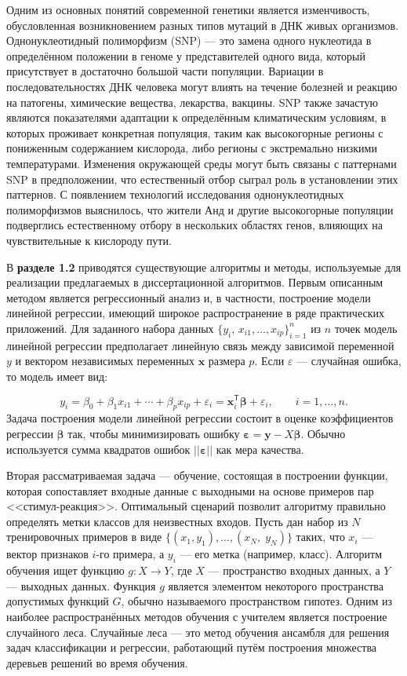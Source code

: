 Одним из основных понятий современной генетики является изменчивость, обусловленная возникновением разных типов мутаций в ДНК живых организмов. Однонуклеотидный полиморфизм (SNP) --- это замена одного нуклеотида в определённом положении в геноме у представителей одного вида, который присутствует в достаточно большой части популяции. Вариации в последовательностях ДНК человека могут влиять на течение болезней и реакцию на патогены, химические вещества, лекарства, вакцины. SNP также зачастую являются показателями адаптации к определённым климатическим условиям, в которых проживает конкретная популяция, таким как высокогорные регионы с пониженным содержанием кислорода, либо регионы с экстремально низкими температурами. Изменения окружающей среды могут быть связаны с паттернами SNP в предположении, что естественный отбор сыграл роль в установлении этих паттернов. С появлением технологий исследования однонуклеотидных полиморфизмов выяснилось, что жители Анд и другие высокогорные популяции подверглись естественному отбору в нескольких областях генов, влияющих на чувствительные к кислороду пути. 

В \textbf{разделе 1.2} приводятся существующие алгоритмы и методы, используемые для реализации предлагаемых в диссертационной алгоритмов. Первым описанным методом является регрессионный анализ и, в частности, построение модели линейной регрессии, имеющий широкое распространение в ряде практических приложений. Для заданного набора данных $\{y_{i},\,x_{i1},\ldots,x_{ip}\}_{i=1}^{n}$ из $n$ точек модель линейной регрессии предполагает линейную связь между зависимой переменной $y$ и вектором независимых переменных $\textbf{x}$ размера $p$. Если $\varepsilon$ --- случайная ошибка, то модель имеет вид:

\[
y_{i}=\beta_{0} + \beta_{1} x_{i1} + \cdots + \beta_{p} x_{ip} + \varepsilon_{i} = \mathbf{x}_{i}^{\mathsf{T}}{\boldsymbol{\beta}} + \varepsilon_{i}, \qquad i = 1, \ldots, n.
\]
Задача построения модели линейной регрессии состоит в оценке коэффициентов регрессии ${\boldsymbol{\beta}}$ так, чтобы минимизировать ошибку ${\boldsymbol{\varepsilon}} = \mathbf{y} - X{\boldsymbol{\beta}}$. Обычно используется сумма квадратов ошибок $||{\boldsymbol{\varepsilon}}||$ как мера качества. 

Вторая рассматриваемая задача --- обучение, состоящая в построении функции, которая сопоставляет входные данные с выходными на основе примеров пар <<стимул-реакция>>. Оптимальный сценарий позволит алгоритму правильно определять метки классов для неизвестных входов. Пусть дан набор из $N$ тренировочных примеров в виде $\{(x_1, y_1), ..., (x_N,\; y_N)\}$ таких, что $x_{i}$ --- вектор признаков $i$-го примера, а $y_{i}$ --- его метка (например, класс). Алгоритм обучения ищет функцию $g: X \to Y$, где $X$ --- пространство входных данных, а $Y$ --- выходных данных. Функция $g$ является элементом некоторого пространства допустимых функций $G$, обычно называемого пространством гипотез. Одним из наиболее распространённых методов обучения с учителем является построение случайного леса. Случайные леса --- это метод обучения ансамбля для решения задач классификации и регрессии, работающий путём построения множества деревьев решений во время обучения. 

